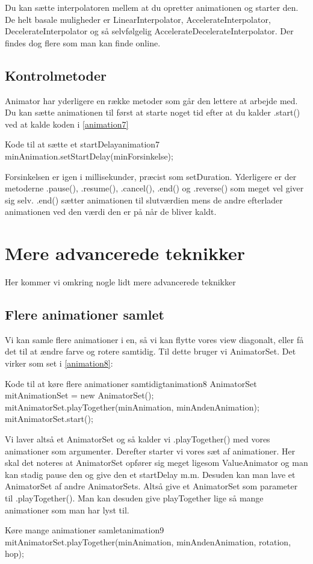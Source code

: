 Du kan sætte interpolatoren mellem at du opretter animationen og starter den.
De helt basale muligheder er LinearInterpolator, AccelerateInterpolator, DecelerateInterpolator og så selvfølgelig AccelerateDecelerateInterpolator. Der findes dog flere som man kan finde online.
\subsection{Kontrolmetoder}
Animator har yderligere en række metoder som går den lettere at arbejde med. Du kan sætte animationen til først at starte noget tid efter at du kalder .start() ved at kalde koden i \autoref{animation7} \\
\begin{JavaCode}{Kode til at sætte et startDelay}{animation7}
	minAnimation.setStartDelay(minForsinkelse);
\end{JavaCode}
Forsinkelsen er igen i millisekunder, præcist som setDuration. 
Yderligere er der metoderne .pause(), .resume(), .cancel(),  .end() og .reverse() som meget vel giver sig selv. .end() sætter animationen til slutværdien mens de andre efterlader animationen ved den værdi den er på når de bliver kaldt.
\section{Mere advancerede teknikker}
Her kommer vi omkring nogle lidt mere advancerede teknikker
\subsection{Flere animationer samlet}
Vi kan samle flere animationer i en, så vi kan flytte vores view diagonalt, eller få det til at ændre farve og rotere samtidig. Til dette bruger vi AnimatorSet. Det virker som set i \autoref{animation8}:
\begin{JavaCode}{Kode til at køre flere animationer samtidigt}{animation8}
AnimatorSet mitAnimationSet = new AnimatorSet();
mitAnimatorSet.playTogether(minAnimation, minAndenAnimation);
mitAnimatorSet.start();
\end{JavaCode}
Vi laver altså et AnimatorSet og så kalder vi .playTogether() med vores animationer som argumenter. Derefter starter vi vores sæt af animationer. Her skal det noteres at AnimatorSet opfører sig meget ligesom ValueAnimator og man kan stadig pause den og give den et startDelay m.m. 
Desuden kan man lave et AnimatorSet af andre AnimatorSets. Altså give et AnimatorSet som parameter til .playTogether(). Man kan desuden give playTogether lige så mange animationer som man har lyst til.
\begin{JavaCode}{Køre mange animationer samlet}{animation9}
	mitAnimatorSet.playTogether(minAnimation, minAndenAnimation, rotation, hop);
\end{JavaCode}

